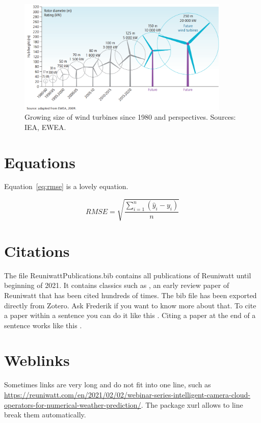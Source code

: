 \documentclass[a4paper,12pt]{article}
\begin{document}
\begin{figure}[!htb]
  \centering
  \includegraphics[width=0.9\textwidth]{figures/TurbineGrowth.png}
  \caption{Growing size of wind turbines since 1980 and perspectives. Sources: IEA, EWEA.}
  \label{fig:turbinegrowth}
\end{figure}

\section{Equations}

Equation~\ref{eq:rmse} is a lovely equation.

\begin{equation}
  RMSE=\sqrt{\frac{\sum_{i=1}^{n} (\hat{y}_i - y_i)}{n}}
  \label{eq:rmse}
\end{equation}

\section{Citations}

The file ReuniwattPublications.bib contains all publications of Reuniwatt until beginning of 2021. It contains classics such as \cite{diagne_review_2013}, an early review paper of Reuniwatt that has been cited hundreds of times. The bib file has been exported directly from Zotero. Ask Frederik if you want to know more about that. To cite a paper within a sentence you can do it like this \cite{liandrat_comparison_2021}. Citing a paper at the end of a sentence works like this \citep{roussel_cloud_2019}.

\newpage

\section{Weblinks}

Sometimes links are very long and do not fit into one line, such as \url{https://reuniwatt.com/en/2021/02/02/webinar-series-intelligent-camera-cloud-operators-for-numerical-weather-prediction/}. The package xurl allows to line break them automatically.



\end{document}
